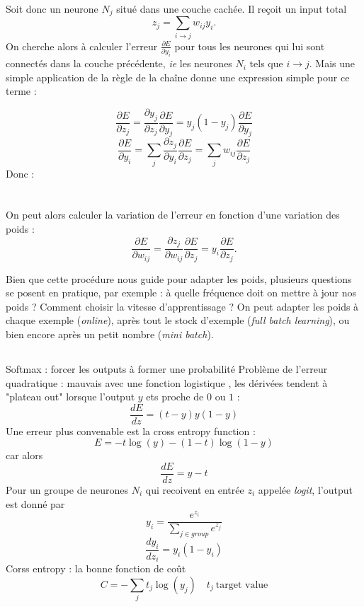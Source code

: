 \documentclass{article}
\theoremstyle{definition}
\begin{document}
Soit donc un neurone $N_j$ situé dans une couche cachée. Il reçoit un input total 
\[z_j=\sum_{i\rightarrow j} w_{ij}y_i.\]
On cherche alors à calculer l'erreur $\frac{\partial E}{\partial y_i}$ pour tous les neurones qui lui sont connectés dans la couche précédente, \textit{ie} les neurones $N_i$ tels que $i\rightarrow j$. Mais une simple application de la règle de la chaîne donne une expression simple pour ce terme :

\[\frac{\partial E}{\partial z_j}=\frac{\partial y_j}{\partial z_j}\frac{\partial E}{\partial y_j}=y_j(1-y_j)\frac{\partial E}{\partial y_j}\]
\[\frac{\partial E}{\partial y_i}=\sum_j\frac{\partial z_j}{\partial y_i}\frac{\partial E}{\partial z_j}=\sum_j w_{ij}\frac{\partial E}{\partial z_j}\]
Donc :\\

\\
\\
On peut alors calculer la variation de l'erreur en fonction d'une variation des poids :
\[\frac{\partial E}{\partial w_{ij}}=\frac{\partial z_j}{\partial w_{ij}}\frac{\partial E}{\partial z_j}=y_i\frac{\partial E}{\partial z_j}.\]

Bien que cette procédure nous guide pour adapter les poids, plusieurs questions se posent en pratique, par exemple : à quelle fréquence doit on mettre à jour nos poids ? Comment choisir la vitesse d'apprentissage ? On peut adapter les poids à chaque exemple (\textit{online}), après tout le stock d'exemple (\textit{full batch learning}), ou bien encore après un petit nombre (\textit{mini batch}).\\

\subsection{}
Softmax : forcer les outputs à former une probabilité
Problème de l'erreur quadratique : mauvais avec une fonction logistique , les dérivées tendent à "plateau out" lorsque l'output $y$ ets proche de $0$ ou $1$ : 
\[\frac{dE}{dz}=(t-y)y(1-y)\]
Une erreur plus convenable est la cross entropy function :
\[E=-t\log(y)-(1-t)\log(1-y)\] 
car alors \[\frac{dE}{dz}=y-t\]
Pour un groupe de neurones $N_i$ qui recoivent en entrée $z_i$ appelée \textit{logit}, l'output est donné par 
\[y_i=\frac{e^{z_i}}{\sum_{j\in group} e^{z_j}}\]
\[\frac{dy_i}{dz_i}=y_i(1-y_i)\]
Corss entropy : la bonne fonction de coût \[C=-\sum_j t_j \log(y_j)\quad t_j \ \text{target value}\]
\end{document}

